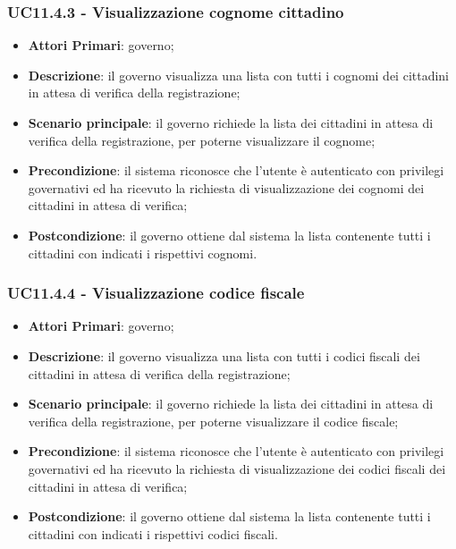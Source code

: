 \subsubsection{UC11.4.3 - Visualizzazione cognome cittadino}
	\begin{itemize}
	\item \textbf{Attori Primari}: governo;
	\item \textbf{Descrizione}: il governo visualizza una lista con tutti i cognomi dei cittadini in attesa di verifica della registrazione;
	\item \textbf{Scenario principale}: il governo richiede la lista dei cittadini in attesa di verifica della registrazione, per poterne visualizzare il cognome;
	\item \textbf{Precondizione}: il sistema riconosce che l'utente è autenticato con privilegi governativi ed ha ricevuto la richiesta di visualizzazione dei cognomi dei cittadini in attesa di verifica;
	\item \textbf{Postcondizione}: il governo ottiene dal sistema la lista contenente tutti i cittadini con indicati i rispettivi cognomi.
\end{itemize}
\subsubsection{UC11.4.4 - Visualizzazione codice fiscale}
\begin{itemize}
	\item \textbf{Attori Primari}: governo;
	\item \textbf{Descrizione}: il governo visualizza una lista con tutti i codici fiscali dei cittadini in attesa di verifica della registrazione;
	\item \textbf{Scenario principale}: il governo richiede la lista dei cittadini in attesa di verifica della registrazione, per poterne visualizzare il codice fiscale;
	\item \textbf{Precondizione}: il sistema riconosce che l'utente è autenticato con privilegi governativi ed ha ricevuto la richiesta di visualizzazione dei codici fiscali dei cittadini in attesa di verifica;
	\item \textbf{Postcondizione}: il governo ottiene dal sistema la lista contenente tutti i cittadini con indicati i rispettivi codici fiscali.
\end{itemize}
